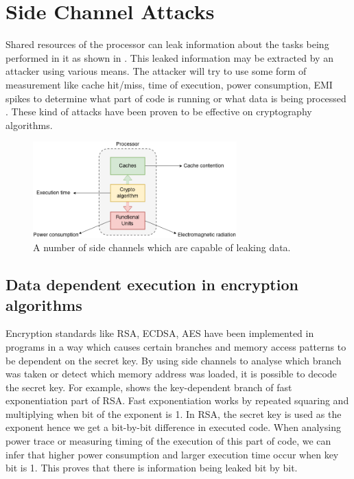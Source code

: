 \chapter{Side Channel Attacks}

Shared resources of the processor can leak information about the tasks
being performed in it as shown in .
This leaked information may be extracted by an attacker using
various means. The attacker will try to use some form of measurement like
cache hit/miss, time of execution, power consumption, EMI spikes to determine
what part of code is running or what data is being processed
. These kind of attacks have been proven to be effective
on cryptography algorithms.

\begin{figure}[h]
    \centering
    \includegraphics[width=0.7\textwidth]{figures/side_channel}
    \caption[Data leakage sources]{A number of side channels
    which are capable of leaking data.}
    \label{fig:dls}
\end{figure}

\section{Data dependent execution in encryption algorithms}

Encryption standards like RSA, ECDSA, AES have been implemented in programs in
a way which causes certain branches and memory access patterns to be dependent
on the secret key. By using side channels to analyse which branch was taken or
detect which memory address was loaded, it is possible to decode the secret
key. For example,  shows the key-dependent branch of fast
exponentiation part of RSA. Fast exponentiation works by repeated squaring and
multiplying when bit of the exponent is 1. In RSA, the secret key is used as
the exponent hence we get a bit-by-bit difference in executed code. When
analysing power trace or measuring timing of the execution of this part of
code, we can infer that higher power consumption and larger execution time
occur when key bit is 1. This proves that there is information being leaked
bit by bit.

